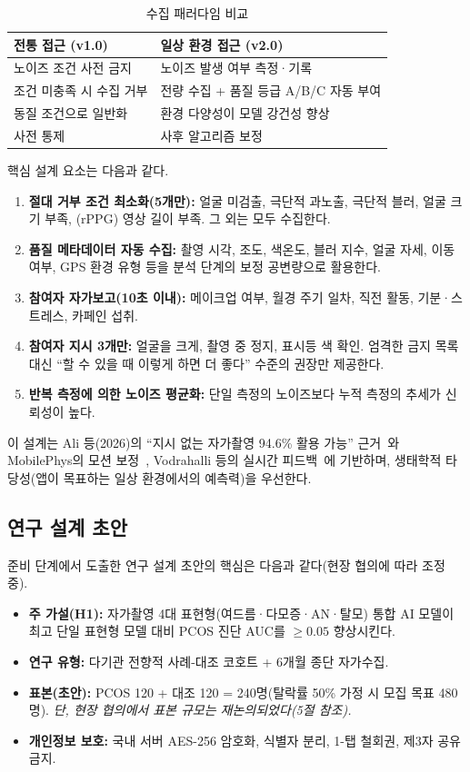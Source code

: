 \documentclass[11pt,a4paper]{article}
\begin{document}
\begin{table}[h]
\centering
\footnotesize
\renewcommand{\arraystretch}{1.25}
\caption{수집 패러다임 비교}
\label{tab:paradigm}
\begin{tabularx}{\textwidth}{@{}L L@{}}
\toprule
\textbf{전통 접근 (v1.0)} & \textbf{일상 환경 접근 (v2.0)} \\
\midrule
노이즈 조건 사전 금지 & 노이즈 발생 여부 측정·기록 \\
조건 미충족 시 수집 거부 & 전량 수집 + 품질 등급 A/B/C 자동 부여 \\
동질 조건으로 일반화 & 환경 다양성이 모델 강건성 향상 \\
사전 통제 & 사후 알고리즘 보정 \\
\bottomrule
\end{tabularx}
\end{table}

핵심 설계 요소는 다음과 같다.
\begin{enumerate}
  \item \textbf{절대 거부 조건 최소화(5개만):} 얼굴 미검출, 극단적 과노출, 극단적 블러, 얼굴 크기 부족, (rPPG) 영상 길이 부족. 그 외는 모두 수집한다.
  \item \textbf{품질 메타데이터 자동 수집:} 촬영 시각, 조도, 색온도, 블러 지수, 얼굴 자세, 이동 여부, GPS 환경 유형 등을 분석 단계의 보정 공변량으로 활용한다.
  \item \textbf{참여자 자가보고(10초 이내):} 메이크업 여부, 월경 주기 일차, 직전 활동, 기분·스트레스, 카페인 섭취.
  \item \textbf{참여자 지시 3개만:} 얼굴을 크게, 촬영 중 정지, 표시등 색 확인. 엄격한 금지 목록 대신 ``할 수 있을 때 이렇게 하면 더 좋다'' 수준의 권장만 제공한다.
  \item \textbf{반복 측정에 의한 노이즈 평균화:} 단일 측정의 노이즈보다 누적 측정의 추세가 신뢰성이 높다.
\end{enumerate}

이 설계는 Ali 등(2026)의 ``지시 없는 자가촬영 94.6\% 활용 가능'' 근거~\cite{ref12}와 MobilePhys의 모션 보정~\cite{ref7}, Vodrahalli 등의 실시간 피드백~\cite{ref11}에 기반하며, 생태학적 타당성(앱이 목표하는 일상 환경에서의 예측력)을 우선한다.

\subsection{연구 설계 초안}
준비 단계에서 도출한 연구 설계 초안의 핵심은 다음과 같다(현장 협의에 따라 조정 중).
\begin{itemize}
  \item \textbf{주 가설(H1):} 자가촬영 4대 표현형(여드름·다모증·AN·탈모) 통합 AI 모델이 최고 단일 표현형 모델 대비 PCOS 진단 AUC를 $\geq 0.05$ 향상시킨다.
  \item \textbf{연구 유형:} 다기관 전향적 사례-대조 코호트 + 6개월 종단 자가수집.
  \item \textbf{표본(초안):} PCOS 120 + 대조 120 = 240명(탈락률 50\% 가정 시 모집 목표 480명). \emph{단, 현장 협의에서 표본 규모는 재논의되었다(5절 참조).}
  \item \textbf{개인정보 보호:} 국내 서버 AES-256 암호화, 식별자 분리, 1-탭 철회권, 제3자 공유 금지.
\end{itemize}
\end{document}
